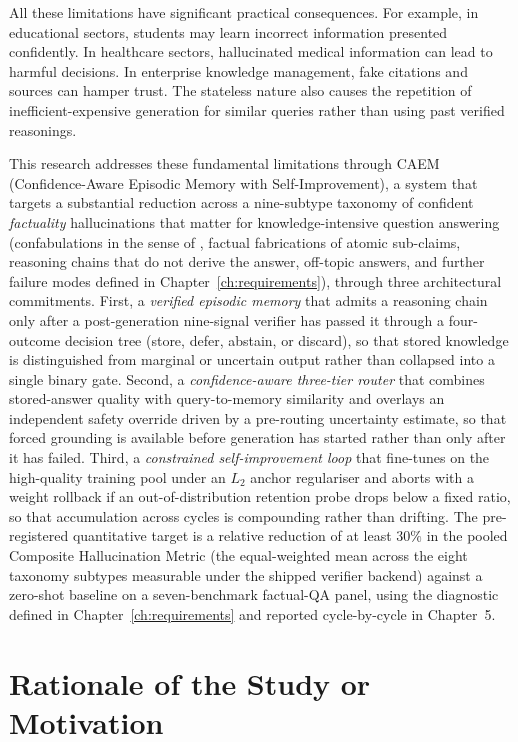 All these limitations have significant practical consequences. For example, in educational sectors, students may learn incorrect information presented confidently. In healthcare sectors, hallucinated medical information can lead to harmful decisions. In enterprise knowledge management, fake citations and sources can hamper trust. The stateless nature also causes the repetition of inefficient-expensive generation for similar queries rather than using past verified reasonings.

This research addresses these fundamental limitations through CAEM (Confidence-Aware Episodic Memory with Self-Improvement), a system that targets a substantial reduction across a nine-subtype taxonomy of confident \textit{factuality} hallucinations that matter for knowledge-intensive question answering (confabulations in the sense of \citet{farquhar2024semantic}, factual fabrications of atomic sub-claims, reasoning chains that do not derive the answer, off-topic answers, and further failure modes defined in Chapter~\ref{ch:requirements}), through three architectural commitments. First, a \textit{verified episodic memory} that admits a reasoning chain only after a post-generation nine-signal verifier has passed it through a four-outcome decision tree (store, defer, abstain, or discard), so that stored knowledge is distinguished from marginal or uncertain output rather than collapsed into a single binary gate. Second, a \textit{confidence-aware three-tier router} that combines stored-answer quality with query-to-memory similarity and overlays an independent safety override driven by a pre-routing uncertainty estimate, so that forced grounding is available before generation has started rather than only after it has failed. Third, a \textit{constrained self-improvement loop} that fine-tunes on the high-quality training pool under an $L_{2}$ anchor regulariser and aborts with a weight rollback if an out-of-distribution retention probe drops below a fixed ratio, so that accumulation across cycles is compounding rather than drifting. The pre-registered quantitative target is a relative reduction of at least $30\%$ in the pooled Composite Hallucination Metric (the equal-weighted mean across the eight taxonomy subtypes measurable under the shipped verifier backend) against a zero-shot baseline on a seven-benchmark factual-QA panel, using the diagnostic defined in Chapter~\ref{ch:requirements} and reported cycle-by-cycle in Chapter~5.

\section{Rationale of the Study or Motivation}

